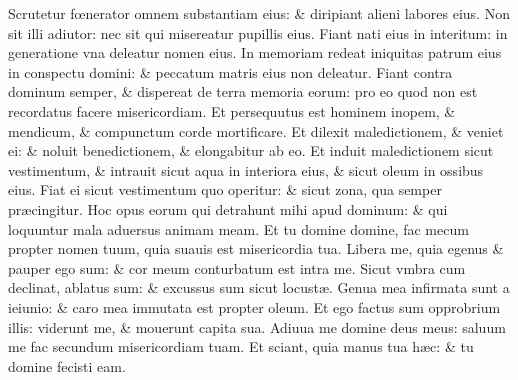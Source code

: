 \documentclass[a5paper,10pt]{book}
\def\ae{æ}
\def\oe{œ}
\begin{document}
\begin{multicols*}{2}
\newline \color{red} S\color{black}crutetur f\oe nerator omnem substantiam eius: \& diripiant alieni labores eius.
\newline \color{red} N\color{black}on sit illi adiutor: nec sit qui misereatur pupillis eius.
\newline \color{red} F\color{black}iant nati eius in interitum: in generatione vna deleatur nomen eius.
\newline \color{red} I\color{black}n memoriam redeat iniquitas patrum eius in conspectu domini: \& peccatum matris eius non deleatur.
\newline \color{red} F\color{black}iant contra dominum semper, \& dispereat de terra memoria eorum: pro eo quod non est recordatus facere misericordiam.
\newline \color{red} E\color{black}t persequutus est hominem inopem, \& mendicum, \& compunctum corde mortificare.
\newline \color{red} E\color{black}t dilexit maledictionem, \& veniet ei: \& noluit benedictionem, \& elongabitur ab eo.
\newline \color{red} E\color{black}t induit maledictionem sicut vestimentum, \& intrauit sicut aqua in interiora eius, \& sicut oleum in ossibus eius.
\newline \color{red} F\color{black}iat ei sicut vestimentum quo operitur: \& sicut zona, qua semper pr\ae cingitur.
\newline \color{red} H\color{black}oc opus eorum qui detrahunt mihi apud dominum: \& qui loquuntur mala aduersus animam meam.
\newline \color{red} E\color{black}t tu domine domine, fac mecum propter nomen tuum, quia suauis est misericordia tua.
\newline \color{red} L\color{black}ibera me, quia egenus \& pauper ego sum: \& cor meum conturbatum est intra me.
\newline \color{red} S\color{black}icut vmbra cum declinat, ablatus sum: \& excussus sum sicut locust\ae .
\newline \color{red} G\color{black}enua mea infirmata sunt a ieiunio: \& caro mea immutata est propter oleum.
\newline \color{red} E\color{black}t ego factus sum opprobrium illis: viderunt me, \& mouerunt capita sua.
\newline \color{red} A\color{black}diuua me domine deus meus: saluum me fac secundum misericordiam tuam.
\newline \color{red} E\color{black}t sciant, quia manus tua h\ae c: \& tu domine fecisti eam.

\end{multicols*}
\end{document}
